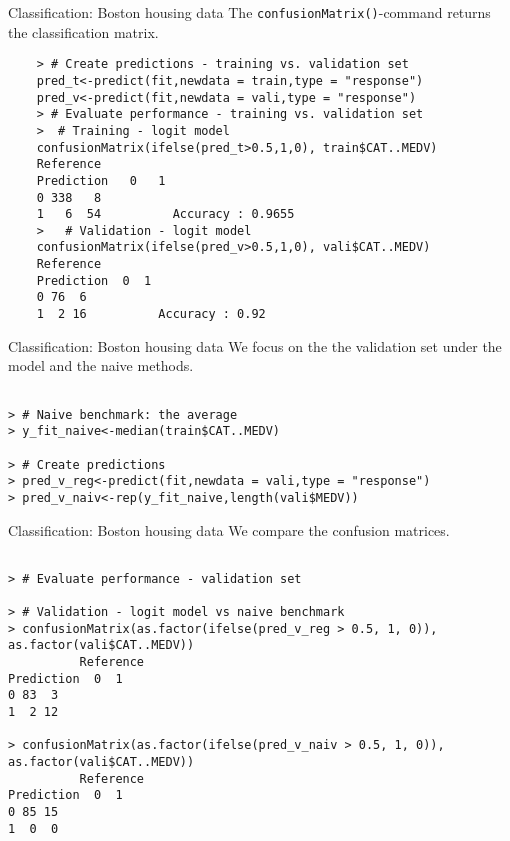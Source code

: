 \documentclass{beamer}
\newcommand{\code}[1]{\texttt{#1}}
\begin{document}
\begin{frame}[fragile]{Classification: Boston housing data}
	The \code{confusionMatrix()}-command returns the classification matrix.
	\begin{lstlisting}
	> # Create predictions - training vs. validation set 
	pred_t<-predict(fit,newdata = train,type = "response")
	pred_v<-predict(fit,newdata = vali,type = "response")	
	> # Evaluate performance - training vs. validation set 
	>  # Training - logit model
	confusionMatrix(ifelse(pred_t>0.5,1,0), train$CAT..MEDV)
	Reference
	Prediction   0   1
	0 338   8
	1   6  54          Accuracy : 0.9655
	>   # Validation - logit model
	confusionMatrix(ifelse(pred_v>0.5,1,0), vali$CAT..MEDV)
	Reference
	Prediction  0  1
	0 76  6
	1  2 16          Accuracy : 0.92
	\end{lstlisting}
\end{frame}



\begin{frame}[fragile]{Classification: Boston housing data}
We focus on the the validation set under the model and the naive methods.
	\begin{lstlisting}
	
> # Naive benchmark: the average
> y_fit_naive<-median(train$CAT..MEDV)

> # Create predictions
> pred_v_reg<-predict(fit,newdata = vali,type = "response")
> pred_v_naiv<-rep(y_fit_naive,length(vali$MEDV))

	\end{lstlisting}
\end{frame}


\begin{frame}[fragile]{Classification: Boston housing data}
We compare the confusion matrices.
	\begin{lstlisting}
	
> # Evaluate performance - validation set

> # Validation - logit model vs naive benchmark
> confusionMatrix(as.factor(ifelse(pred_v_reg > 0.5, 1, 0)), as.factor(vali$CAT..MEDV))
          Reference
Prediction  0  1
0 83  3
1  2 12

> confusionMatrix(as.factor(ifelse(pred_v_naiv > 0.5, 1, 0)), as.factor(vali$CAT..MEDV))
          Reference
Prediction  0  1
0 85 15
1  0  0
	
	\end{lstlisting}
\end{frame}
\end{document}
